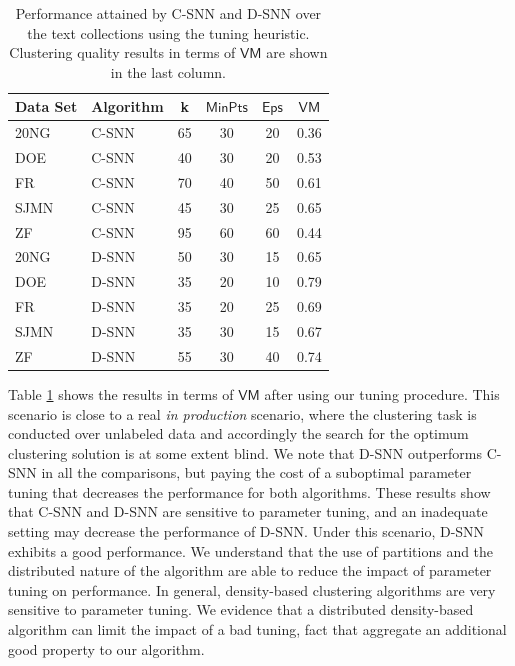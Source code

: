 \documentclass[preprint,12pt,authoryear,review]{elsarticle}
\begin{document}

\begin{table}[!htbp]
\centering
\begin{tabular}{|l|l|c|c|c|c|}
\hline
Data Set  &  Algorithm &  k  & $\mathsf{MinPts}$ & $\mathsf{Eps}$ & $\mathsf{VM}$ \\
\hline \hline
20NG      &  C-SNN     &  65 &  30  &  20  &  0.36  \\  
DOE       &  C-SNN     &  40 &  30  &  20  &  0.53  \\
FR        &  C-SNN     &  70 &  40  &  50  &  0.61  \\
SJMN      &  C-SNN     &  45 &  30  &  25  &  0.65  \\
ZF        &  C-SNN     &  95 &  60  &  60  &  0.44  \\
20NG      &  D-SNN     &  50 &  30  &  15  &  0.65  \\
DOE       &  D-SNN     &  35 &  20  &  10  &  0.79  \\
FR        &  D-SNN     &  35 &  20  &  25  &  0.69  \\
SJMN      &  D-SNN     &  35 &  30  &  15  &  0.67  \\
ZF        &  D-SNN     &  55 &  30  &  40  &  0.74  \\
\hline
\end{tabular}
\caption{Performance attained by C-SNN and D-SNN over the text collections using the tuning heuristic. Clustering quality results in terms of $\textsf{VM}$ are shown in the last column.}
\label{table:tune}
\end{table}

Table \ref{table:tune} shows the results in terms of $\mathsf{VM}$ after using our tuning procedure. This scenario is close to a real \textit{in production} scenario, where the clustering task is conducted over unlabeled data and accordingly the search for the optimum clustering solution is at some extent blind. We note that D-SNN outperforms C-SNN in all the comparisons, but paying the cost of a suboptimal parameter tuning that decreases the performance for both algorithms. These results show that C-SNN and D-SNN are sensitive to parameter tuning, and an inadequate setting may decrease the performance of D-SNN. Under this scenario, D-SNN exhibits a good performance. We understand that the use of partitions and the distributed nature of the algorithm are able to reduce the impact of parameter tuning on performance. In general, density-based clustering algorithms are very sensitive to parameter tuning. We evidence that a distributed density-based algorithm can limit the impact of a bad tuning, fact that aggregate an additional good property to our algorithm. 
\end{document}
